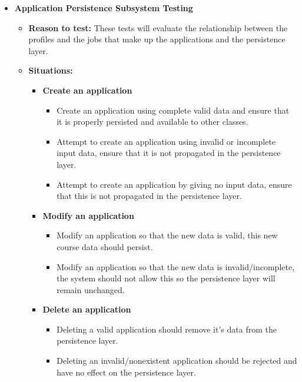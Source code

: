 \documentclass[12pt]{report}
\begin{document}
\begin{itemize}
\begin{itemize}
\begin{itemize}
             \end{itemize}
         \end{itemize}

    \item \textbf{Application Persistence Subsystem Testing}
         \begin{itemize}
             \item \textbf{Reason to test:} These tests will evaluate the relationship between the profiles and the jobs that make up the applications and the persistence layer.
             \item \textbf{Situations:}
             \begin{itemize}
                 \item \textbf{Create an application}
                 \begin{itemize}
                     \item Create an application using complete valid data and ensure that it is properly persisted and available to other classes.
                     \item Attempt to create an application using invalid or incomplete input data, ensure that it is not propagated in the persistence layer.
                     \item Attempt to create an application by giving no input data, ensure that this is not propagated in the persistence layer.
                 \end{itemize}
                 \item \textbf{Modify an application}
                 \begin{itemize}
                     \item Modify an application so that the new data is valid, this new course data should persist.
                     \item Modify an application so that the new data is invalid/incomplete, the system should not allow this so the persistence layer will remain unchanged.
                 \end{itemize}
                 \item \textbf{Delete an application}
                 \begin{itemize}
                    \item Deleting a valid application should remove it's data from the persistence layer.
                     \item Deleting an invalid/nonexistent application should be rejected and have no effect on the persistence layer.
                 \end{itemize}
             \end{itemize}
         \end{itemize}
\end{itemize}     
\end{document}
